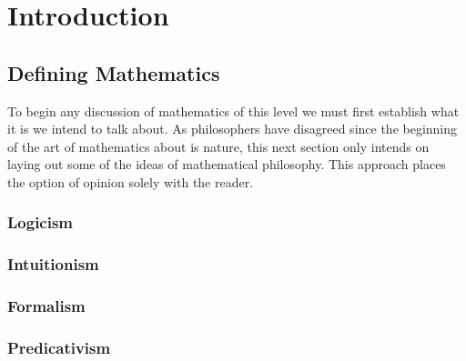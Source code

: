 \chapter{Introduction}

\section{Defining Mathematics}

To begin any discussion of mathematics of this level we must first establish what it is we intend to talk about.
As philosophers have disagreed since the beginning of the art of mathematics about is nature, this next section only intends on laying out some of the ideas of mathematical philosophy.
This approach places the option of opinion solely with the reader.



\subsection{Logicism}
\subsection{Intuitionism}
\subsection{Formalism}
\subsection{Predicativism}

